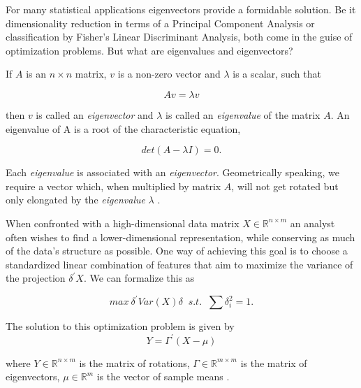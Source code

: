 \documentclass[12pt]{article}
\begin{document}
For many statistical applications eigenvectors provide a formidable solution. Be it dimensionality reduction in terms of a Principal Component Analysis or classification by Fisher's Linear Discriminant Analysis, both come in the guise of optimization problems. But what are eigenvalues and eigenvectors?

If $A$ is an $n \times n$ matrix, $v$ is a non-zero vector and $\lambda$ is a scalar, such that

\begin{equation}
\label{eigenvalue-def}
Av = \lambda v
\end{equation}

then $v$ is called an \textit{eigenvector} and $\lambda$ is called an \textit{eigenvalue} of the matrix $A$.
An eigenvalue of A is a root of the characteristic equation,

\begin{equation}
\label{eigenvalue-solve}
det\left(A - \lambda I \right) = 0.
\end{equation}

Each \textit{eigenvalue} is associated with an \textit{eigenvector}. Geometrically speaking, we require a vector which, when multiplied by matrix $A$, will not get rotated but only elongated by the \textit{eigenvalue} $\lambda$ \citep[p. 13]{NME}.

When confronted with a high-dimensional data matrix $X \in \mathbb{R}^{n \times m}$ an analyst often wishes to find a lower-dimensional representation, while conserving as much of the data's structure as possible. One way of achieving this goal is to choose a standardized linear combination of features that aim to maximize the variance of the projection $\delta^{\prime} X$. We can formalize this as

\begin{equation}
	\label{pca_obj}
    	max\ \delta^{\prime} Var \left(X\right) \delta \;\; s.t. \;\; \sum \delta_i^2 = 1.
\end{equation}

The solution to this optimization problem is given by
\begin{equation}
\label{pca_sol}
	Y = \Gamma^{\prime} \left(X - \mu\right)
\end{equation}

where $Y \in \mathbb{R}^{n \times m}$ is the matrix of rotations,
	  $\Gamma \in \mathbb{R}^{m \times m}$ is the matrix of eigenvectors,
	  $\mu \in \mathbb{R}^m$ is the vector of sample means \citep[p. 234]{MVA}.
\end{document}
